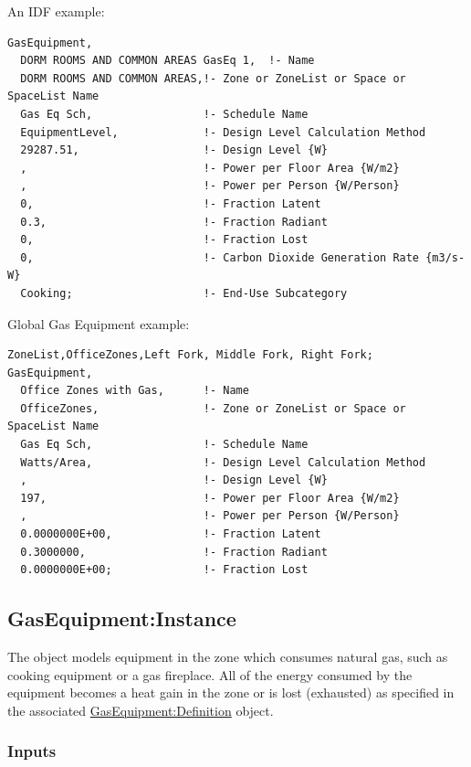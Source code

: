 An IDF example:

\begin{lstlisting}
GasEquipment,
  DORM ROOMS AND COMMON AREAS GasEq 1,  !- Name
  DORM ROOMS AND COMMON AREAS,!- Zone or ZoneList or Space or SpaceList Name
  Gas Eq Sch,                 !- Schedule Name
  EquipmentLevel,             !- Design Level Calculation Method
  29287.51,                   !- Design Level {W}
  ,                           !- Power per Floor Area {W/m2}
  ,                           !- Power per Person {W/Person}
  0,                          !- Fraction Latent
  0.3,                        !- Fraction Radiant
  0,                          !- Fraction Lost
  0,                          !- Carbon Dioxide Generation Rate {m3/s-W}
  Cooking;                    !- End-Use Subcategory
\end{lstlisting}

Global Gas Equipment example:

\begin{lstlisting}
ZoneList,OfficeZones,Left Fork, Middle Fork, Right Fork;
GasEquipment,
  Office Zones with Gas,      !- Name
  OfficeZones,                !- Zone or ZoneList or Space or SpaceList Name
  Gas Eq Sch,                 !- Schedule Name
  Watts/Area,                 !- Design Level Calculation Method
  ,                           !- Design Level {W}
  197,                        !- Power per Floor Area {W/m2}
  ,                           !- Power per Person {W/Person}
  0.0000000E+00,              !- Fraction Latent
  0.3000000,                  !- Fraction Radiant
  0.0000000E+00;              !- Fraction Lost
\end{lstlisting}


\subsection{GasEquipment:Instance}\label{gasequipmentinstance}

The object models equipment in the zone which consumes natural gas, such as cooking equipment or a gas fireplace. All of the energy consumed by the equipment becomes a heat gain in the zone or is lost (exhausted) as specified in the associated \hyperref[gasequipmentdefinition]{GasEquipment:Definition} object.

\subsubsection{Inputs}\label{inputs-4-017-gas-instance}

